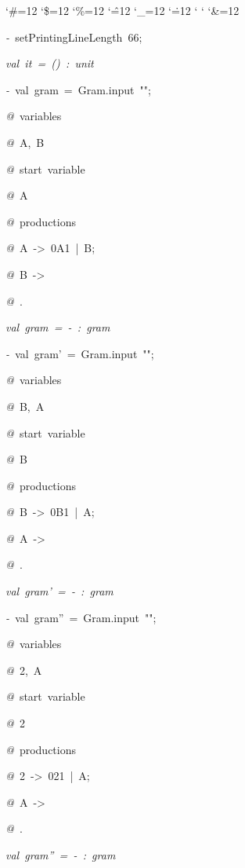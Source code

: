 \begin{list}{}
{\setlength{\leftmargin}{\leftmargini}
\setlength{\rightmargin}{0cm}
\setlength{\itemindent}{0cm}
\setlength{\listparindent}{0cm}
\setlength{\itemsep}{0cm}
\setlength{\parsep}{0cm}
\setlength{\labelsep}{0cm}
\setlength{\labelwidth}{0cm}
\catcode`\#=12
\catcode`\$=12
\catcode`\%=12
\catcode`\^=12
\catcode`\_=12
\catcode`\.=12
\catcode`
\catcode`
\catcode`\&=12
\ttfamily}
\small
\item[]\textsl{-\ }setPrintingLineLength\ 66;
\item[]\textsl{val\ it\ =\ ()\ :\ unit}
\item[]\textsl{-\ }val\ gram\ =\ Gram.input\ "";
\item[]\textsl{@\ }variables
\item[]\textsl{@\ }A,\ B
\item[]\textsl{@\ }start\ variable
\item[]\textsl{@\ }A
\item[]\textsl{@\ }productions
\item[]\textsl{@\ }A\ ->\ 0A1\ |\ B;
\item[]\textsl{@\ }B\ ->\ %
\item[]\textsl{@\ }.
\item[]\textsl{val\ gram\ =\ -\ :\ gram}
\item[]\textsl{-\ }val\ gram'\ =\ Gram.input\ "";
\item[]\textsl{@\ }variables
\item[]\textsl{@\ }B,\ A
\item[]\textsl{@\ }start\ variable
\item[]\textsl{@\ }B
\item[]\textsl{@\ }productions
\item[]\textsl{@\ }B\ ->\ 0B1\ |\ A;
\item[]\textsl{@\ }A\ ->\ %
\item[]\textsl{@\ }.
\item[]\textsl{val\ gram'\ =\ -\ :\ gram}
\item[]\textsl{-\ }val\ gram''\ =\ Gram.input\ "";
\item[]\textsl{@\ }variables
\item[]\textsl{@\ }2,\ A
\item[]\textsl{@\ }start\ variable
\item[]\textsl{@\ }2
\item[]\textsl{@\ }productions
\item[]\textsl{@\ }2\ ->\ 021\ |\ A;
\item[]\textsl{@\ }A\ ->\ %
\item[]\textsl{@\ }.
\item[]\textsl{val\ gram''\ =\ -\ :\ gram}
\end{list}

